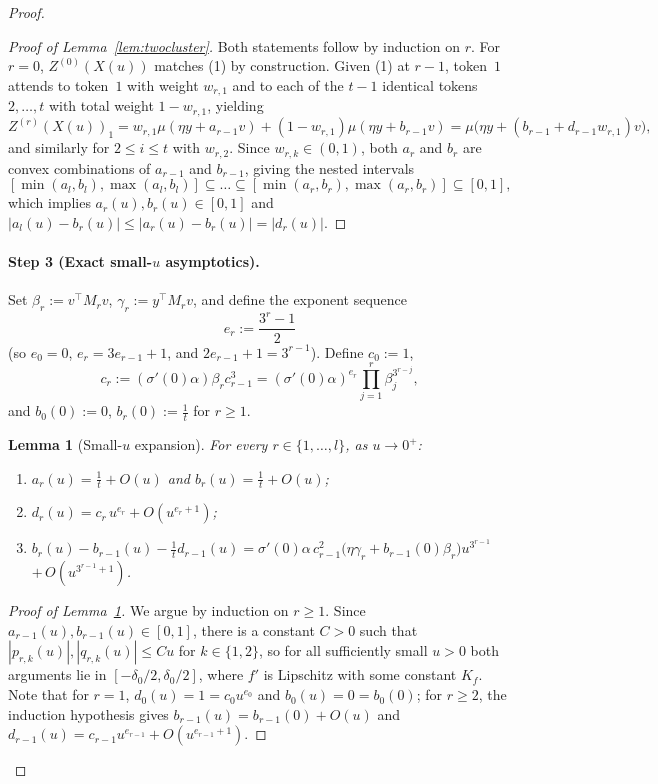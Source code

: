 \documentclass[11pt]{article}
\theoremstyle{plain}
\newtheorem{lemma}{Lemma}
\theoremstyle{definition}
\theoremstyle{remark}
\begin{document}
\begin{proof}
\begin{proof}[Proof of Lemma~\ref{lem:twocluster}]
Both statements follow by induction on $r$. For $r = 0$, $Z^{(0)}(X(u))$ matches (1) by construction. Given (1) at $r - 1$, token~$1$ attends to token~$1$ with weight $w_{r,1}$ and to each of the $t - 1$ identical tokens $2, \dots, t$ with total weight $1 - w_{r,1}$, yielding
\[
Z^{(r)}(X(u))_1 = w_{r,1}\mu(\eta y + a_{r-1}v) + (1 - w_{r,1})\mu(\eta y + b_{r-1}v)
= \mu\bigl(\eta y + (b_{r-1} + d_{r-1}w_{r,1})v\bigr),
\]
and similarly for $2 \le i \le t$ with $w_{r,2}$. Since $w_{r,k} \in (0, 1)$, both $a_r$ and $b_r$ are convex combinations of $a_{r-1}$ and $b_{r-1}$, giving the nested intervals
\[
[\min(a_l, b_l), \max(a_l, b_l)] \subseteq \dots \subseteq [\min(a_r, b_r), \max(a_r, b_r)] \subseteq [0, 1],
\]
which implies $a_r(u), b_r(u) \in [0, 1]$ and $|a_l(u) - b_r(u)| \le |a_r(u) - b_r(u)| = |d_r(u)|$.
\end{proof}

\paragraph{Step 3 (Exact small-$u$ asymptotics).}
Set $\beta_r := v^\top M_r v$, $\gamma_r := y^\top M_r v$, and define the exponent sequence
\[
e_r := \frac{3^r - 1}{2}
\]
(so $e_0 = 0$, $e_r = 3e_{r-1} + 1$, and $2e_{r-1} + 1 = 3^{r-1}$). Define $c_0 := 1$,
\[
c_r := (\sigma'(0)\alpha)\beta_r c_{r-1}^3 = (\sigma'(0)\alpha)^{e_r} \prod_{j=1}^r \beta_j^{3^{r-j}},
\]
and $b_0(0) := 0$, $b_r(0) := \frac{1}{t}$ for $r \ge 1$.

\begin{lemma}[Small-$u$ expansion]\label{lem:asymptotics}
For every $r \in \{1, \dots, l\}$, as $u \to 0^+$:
\begin{enumerate}[label=(\arabic*),leftmargin=2.2em,itemsep=1pt]
    \item $a_r(u) = \frac{1}{t} + O(u)$ and $b_r(u) = \frac{1}{t} + O(u)$;
    \item $d_r(u) = c_r\, u^{e_r} + O(u^{e_r + 1})$;
    \item $\displaystyle b_r(u) - b_{r-1}(u) - \frac{1}{t} d_{r-1}(u) = \sigma'(0)\alpha\, c_{r-1}^2\bigl(\eta \gamma_r + b_{r-1}(0)\beta_r\bigr) u^{3^{r-1}}$ \\
    \hspace*{\fill}$+\, O(u^{3^{r-1} + 1})$.
\end{enumerate}
\end{lemma}

\begin{proof}[Proof of Lemma~\ref{lem:asymptotics}]
We argue by induction on $r \ge 1$. Since $a_{r-1}(u), b_{r-1}(u) \in [0, 1]$, there is a constant $C > 0$ such that $|p_{r,k}(u)|, |q_{r,k}(u)| \le Cu$ for $k \in \{1, 2\}$, so for all sufficiently small $u > 0$ both arguments lie in $[-\delta_0/2, \delta_0/2]$, where $f'$ is Lipschitz with some constant $K_f$. Note that for $r = 1$, $d_0(u) = 1 = c_0 u^{e_0}$ and $b_0(u) = 0 = b_0(0)$; for $r \ge 2$, the induction hypothesis gives $b_{r-1}(u) = b_{r-1}(0) + O(u)$ and $d_{r-1}(u) = c_{r-1}u^{e_{r-1}} + O(u^{e_{r-1}+1})$.


\end{proof}
\end{proof}
\end{document}
